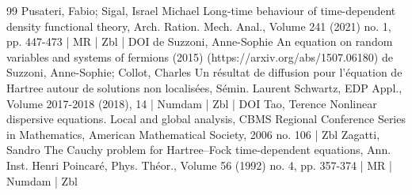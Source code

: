 \begin{thebibliography}{99}
Pusateri, Fabio; Sigal, Israel Michael Long-time behaviour of time-dependent density functional theory, Arch. Ration. Mech. Anal., Volume 241 (2021) no. 1, pp. 447-473 | MR | Zbl | DOI
de Suzzoni, Anne-Sophie An equation on random variables and systems of fermions (2015) (https://arxiv.org/abs/1507.06180)
de Suzzoni, Anne-Sophie; Collot, Charles Un résultat de diffusion pour l’équation de Hartree autour de solutions non localisées, Sémin. Laurent Schwartz, EDP Appl., Volume 2017-2018 (2018), 14 | Numdam | Zbl | DOI
Tao, Terence Nonlinear dispersive equations. Local and global analysis, CBMS Regional Conference Series in Mathematics, American Mathematical Society, 2006 no. 106 | Zbl
Zagatti, Sandro The Cauchy problem for Hartree–Fock time-dependent equations, Ann. Inst. Henri Poincaré, Phys. Théor., Volume 56 (1992) no. 4, pp. 357-374 | MR | Numdam | Zbl
\end{thebibliography}
